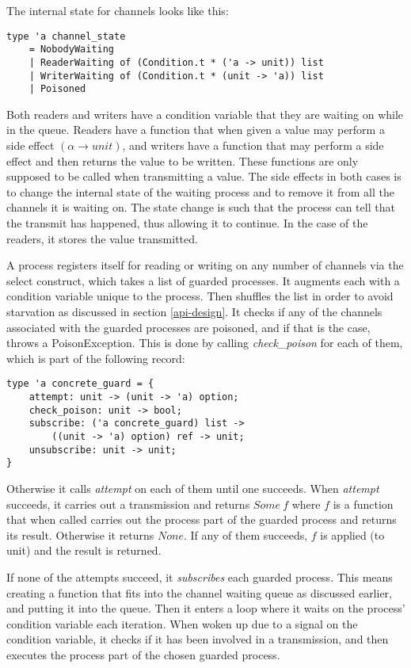 \documentclass[a4paper,12pt]{article}
\begin{document}
\goodbreak
The internal state for channels looks like this:

\begin{verbatim}
type 'a channel_state
    = NobodyWaiting 
    | ReaderWaiting of (Condition.t * ('a -> unit)) list
    | WriterWaiting of (Condition.t * (unit -> 'a)) list
    | Poisoned
\end{verbatim}

Both readers and writers have a condition variable that they are waiting on
while in the queue. Readers have a function that when given a value may perform
a side effect $(\alpha \to unit)$, and writers have a function that may perform
a side effect and then returns the value to be written. These functions are
only supposed to be called when transmitting a value. The side effects in both
cases is to change the internal state of the waiting process and to remove it
from all the channels it is waiting on. The state change is such that the
process can tell that the transmit has happened, thus allowing it to continue.
In the case of the readers, it stores the value transmitted.

A process registers itself for reading or writing on any number of channels via
the select construct, which takes a list of guarded processes. It augments each
with a condition variable unique to the process. Then shuffles the list in order
to avoid starvation as discussed in section \ref{api-design}. It checks if any
of the channels associated with the guarded processes are poisoned, and if
that is the case, throws a PoisonException. This is done by calling
\emph{check\_poison} for each of them, which is part of the following record:

\begin{verbatim}
type 'a concrete_guard = {
    attempt: unit -> (unit -> 'a) option;
    check_poison: unit -> bool;
    subscribe: ('a concrete_guard) list -> 
        ((unit -> 'a) option) ref -> unit;
    unsubscribe: unit -> unit;
}
\end{verbatim}

Otherwise it calls \emph{attempt} on each of them until one succeeds.
When \emph{attempt} succeeds, it carries out a transmission and returns $Some\
f$ where $f$ is a function that when called carries out the process part of the
guarded process and returns its result. Otherwise it returns $None$. If any of
them succeeds, $f$ is applied (to unit) and the result is returned.

If none of the attempts succeed, it \emph{subscribes} each guarded process.
This means creating a function that fits into the channel waiting queue
as discussed earlier, and putting it into the queue. Then it enters a loop
where it waits on the process' condition variable each iteration. When woken up
due to a signal on the condition variable, it checks if it has been involved in
a transmission, and then executes the process part of the chosen guarded
process.
\end{document}
